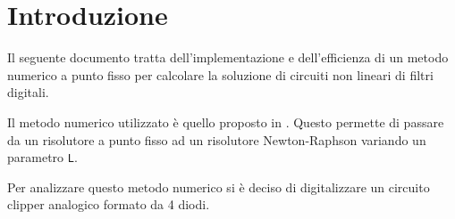 \documentclass[12pt,a4paper,twoside,english,italian]{book}
\begin{document}
	\pagestyle{fancy} 
	\frontmatter
	\maketitle	

	\enlargethispage{-1.5\baselineskip}
	\tableofcontents

	\mainmatter

	\chapter*{Introduzione}
		Il seguente documento tratta dell'implementazione e dell'efficienza di un metodo numerico a punto fisso per calcolare la soluzione di circuiti non lineari di filtri digitali.
		
		Il metodo numerico utilizzato è quello proposto in \cite{bib:fixed-point}. Questo permette di passare da un risolutore a punto fisso ad un risolutore Newton-Raphson variando un parametro \texttt{L}.
		
		Per analizzare questo metodo numerico si è deciso di digitalizzare un circuito clipper analogico formato da 4 diodi.
		
	
	
	
	
	
	
	\appendix
	
	
	
	\backmatter
	
	\printbibliography
\end{document}

